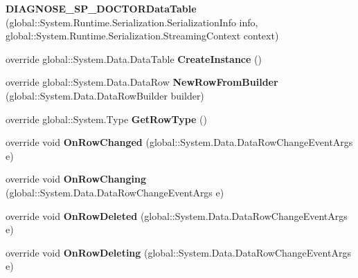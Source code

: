 \begin{CompactItemize}
\item 
\textbf{DIAGNOSE\_\-SP\_\-DOCTORDataTable} (global::System.Runtime.Serialization.SerializationInfo info, global::System.Runtime.Serialization.StreamingContext context)\label{class_automatic_medical_system_1_1_data_set2_1_1_d_i_a_g_n_o_s_e___s_p___d_o_c_t_o_r_data_table_dc210ab9fda69453f452beb5b3e127df}

\item 
override global::System.Data.DataTable \textbf{CreateInstance} ()\label{class_automatic_medical_system_1_1_data_set2_1_1_d_i_a_g_n_o_s_e___s_p___d_o_c_t_o_r_data_table_9863902baaf60ca0bfa36b06967d4dd9}

\item 
override global::System.Data.DataRow \textbf{NewRowFromBuilder} (global::System.Data.DataRowBuilder builder)\label{class_automatic_medical_system_1_1_data_set2_1_1_d_i_a_g_n_o_s_e___s_p___d_o_c_t_o_r_data_table_1e26357b11e99ce8c59e951a45f825df}

\item 
override global::System.Type \textbf{GetRowType} ()\label{class_automatic_medical_system_1_1_data_set2_1_1_d_i_a_g_n_o_s_e___s_p___d_o_c_t_o_r_data_table_1d8ac0b442988b597201d2ad0584b0e5}

\item 
override void \textbf{OnRowChanged} (global::System.Data.DataRowChangeEventArgs e)\label{class_automatic_medical_system_1_1_data_set2_1_1_d_i_a_g_n_o_s_e___s_p___d_o_c_t_o_r_data_table_4f00836112146f42912aa625e5469ca9}

\item 
override void \textbf{OnRowChanging} (global::System.Data.DataRowChangeEventArgs e)\label{class_automatic_medical_system_1_1_data_set2_1_1_d_i_a_g_n_o_s_e___s_p___d_o_c_t_o_r_data_table_ac21f7a7f5f4ab7fc9862a600b74cfda}

\item 
override void \textbf{OnRowDeleted} (global::System.Data.DataRowChangeEventArgs e)\label{class_automatic_medical_system_1_1_data_set2_1_1_d_i_a_g_n_o_s_e___s_p___d_o_c_t_o_r_data_table_7ee68a77f245260bdcfefcb18ff12770}

\item 
override void \textbf{OnRowDeleting} (global::System.Data.DataRowChangeEventArgs e)\label{class_automatic_medical_system_1_1_data_set2_1_1_d_i_a_g_n_o_s_e___s_p___d_o_c_t_o_r_data_table_0cf5cc52ab085dcba4901e5b99d1da61}

\end{CompactItemize}
